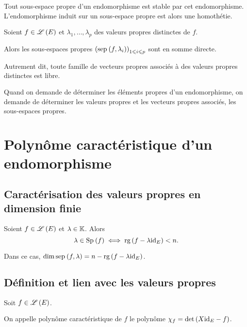 \begin{prop}
Tout sous-espace propre d'un endomorphisme est stable par cet endomorphisme. L'endomorphisme induit sur un sous-espace propre est alors une homothétie.
\end{prop}

\begin{theo}
Soient \(f\in\mathscr{L}\left(E\right)\) et \(\lambda_1,\dots,\lambda_p\) des valeurs propres distinctes de \(f\).

Alors les sous-espaces propres \(\paren{\sep{f}{\lambda_i}}_{1\leq i\leq p}\) sont en somme directe.

Autrement dit, toute famille de vecteurs propres associés à des valeurs propres distinctes est libre.
\end{theo}

\begin{rem}
Quand on demande de déterminer les éléments propres d'un endomorphisme, on demande de déterminer les valeurs propres et les vecteurs propres associés, \ie les sous-espaces propres.
\end{rem}

\begin{center}
\bfseries
{}
\end{center}

\section{Polynôme caractéristique d'un endomorphisme}

\subsection{Caractérisation des valeurs propres en dimension finie}

\begin{prop}
Soient \(f\in\mathscr{L}\left(E\right)\) et \(\lambda\in\mathbb{K}\). Alors \[\lambda\in\Sp{f}\ssi\rg\paren{f-\lambda\id{E}}<n.\]

Dans ce cas, \(\dim\sep{f}{\lambda}=n-\rg\paren{f-\lambda\id{E}}\).
\end{prop}

\subsection{Définition et lien avec les valeurs propres}

\begin{defi}
Soit \(f\in\mathscr{L}\left(E\right)\).

On appelle polynôme caractéristique de \(f\) le polynôme \(\chi_f=\det\left(X\mathrm{id}_{E}-f\right)\).
\end{defi}

